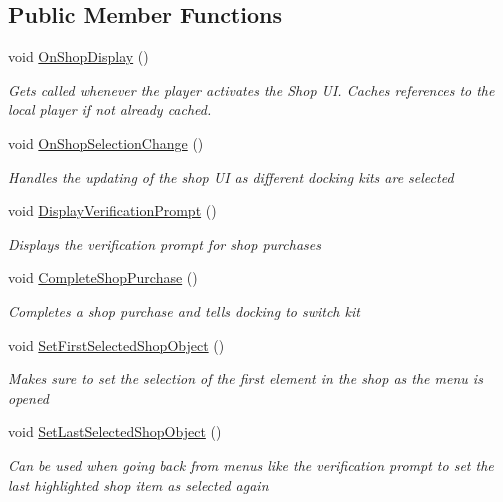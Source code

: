 \subsection*{Public Member Functions}
\begin{DoxyCompactItemize}
\item 
void \hyperlink{class_ingame_menu_handler_ab5a914a3577e1864e87a51015dcdf8c0}{On\+Shop\+Display} ()
\begin{DoxyCompactList}\small\item\em Gets called whenever the player activates the Shop UI. Caches references to the local player if not already cached. \end{DoxyCompactList}\item 
void \hyperlink{class_ingame_menu_handler_a2581d0e185a8fe9ca54d7add14b9db93}{On\+Shop\+Selection\+Change} ()
\begin{DoxyCompactList}\small\item\em Handles the updating of the shop UI as different docking kits are selected \end{DoxyCompactList}\item 
void \hyperlink{class_ingame_menu_handler_ae7468318a2c601be76aed42256465706}{Display\+Verification\+Prompt} ()
\begin{DoxyCompactList}\small\item\em Displays the verification prompt for shop purchases \end{DoxyCompactList}\item 
void \hyperlink{class_ingame_menu_handler_a421bf1a3b39bb441f2ab41d8262bda75}{Complete\+Shop\+Purchase} ()
\begin{DoxyCompactList}\small\item\em Completes a shop purchase and tells docking to switch kit \end{DoxyCompactList}\item 
void \hyperlink{class_ingame_menu_handler_af52e74182c996325dea46ef3ff1ae411}{Set\+First\+Selected\+Shop\+Object} ()
\begin{DoxyCompactList}\small\item\em Makes sure to set the selection of the first element in the shop as the menu is opened \end{DoxyCompactList}\item 
void \hyperlink{class_ingame_menu_handler_a3568838c7f2c58aaf31e1522e81f2019}{Set\+Last\+Selected\+Shop\+Object} ()
\begin{DoxyCompactList}\small\item\em Can be used when going back from menus like the verification prompt to set the last highlighted shop item as selected again \end{DoxyCompactList}\item 

\end{DoxyCompactItemize}
